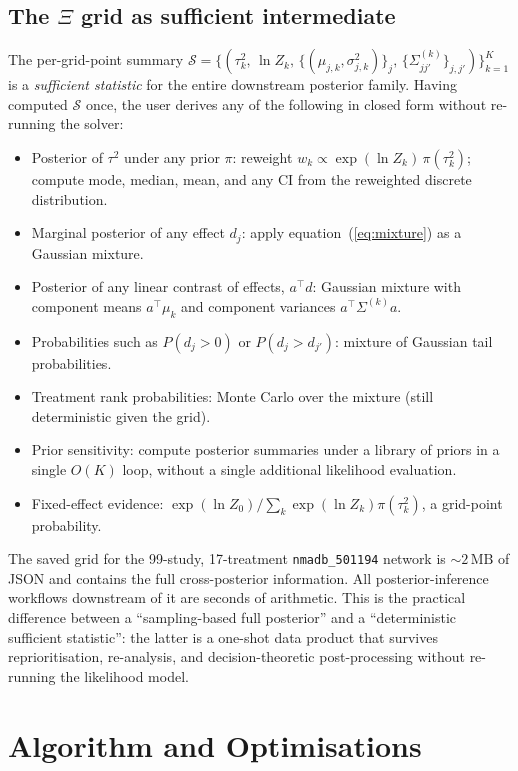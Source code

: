 \documentclass[12pt]{article}
\begin{document}
\subsection{The $\Xi$ grid as sufficient intermediate}
\label{sec:sufficient-intermediate}

The per-grid-point summary
$\mathcal{S} = \{(\tau^2_k,\, \ln Z_k,\, \{(\mu_{j,k}, \sigma^2_{j,k})\}_j,\,
\{\Sigma^{(k)}_{jj'}\}_{j,j'})\}_{k=1}^{K}$
is a \emph{sufficient statistic} for the entire downstream
posterior family. Having computed $\mathcal{S}$ once, the user
derives any of the following in closed form without re-running
the solver:

\begin{itemize}
\item Posterior of $\tau^2$ under any prior $\pi$: reweight
$w_k \propto \exp(\ln Z_k)\,\pi(\tau^2_k)$; compute mode,
median, mean, and any CI from the reweighted discrete
distribution.
\item Marginal posterior of any effect $d_j$: apply
equation~(\ref{eq:mixture}) as a Gaussian mixture.
\item Posterior of any linear contrast of effects,
$a^\top d$: Gaussian mixture with component means
$a^\top \mu_{k}$ and component variances $a^\top \Sigma^{(k)} a$.
\item Probabilities such as $P(d_j > 0)$ or
$P(d_j > d_{j'})$: mixture of Gaussian tail probabilities.
\item Treatment rank probabilities: Monte Carlo over the mixture
(still deterministic given the grid).
\item Prior sensitivity: compute posterior summaries under a
library of priors in a single $O(K)$ loop, without a single
additional likelihood evaluation.
\item Fixed-effect evidence: $\exp(\ln Z_0) / \sum_k \exp(\ln
Z_k)\pi(\tau^2_k)$, a grid-point probability.
\end{itemize}

The saved grid for the 99-study, 17-treatment
\texttt{nmadb\_501194} network is $\sim 2\,\text{MB}$ of JSON and
contains the full cross-posterior information. All
posterior-inference workflows downstream of it are seconds of
arithmetic. This is the practical difference between a
``sampling-based full posterior'' and a ``deterministic
sufficient statistic'': the latter is a one-shot data product
that survives reprioritisation, re-analysis, and decision-theoretic
post-processing without re-running the likelihood model.

\section{Algorithm and Optimisations}
\end{document}
